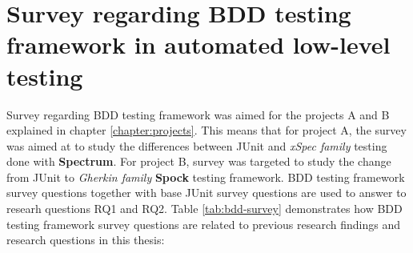     \vspace{20px}
    \begin{table}[H]
            \caption {NPS questions of developer loyalty towards low-level automated testing with JUnit} \label{tab:junit-pt3}

    \end{table}
    \clearpage
\restoregeometry






\section{Survey regarding BDD testing framework in automated low-level testing}
\label{section:bdd-survey}
Survey regarding BDD testing framework was aimed for the projects A and B explained in chapter \ref{chapter:projects}. This means
that for project A, the survey was aimed at to study the differences between JUnit and \textit{xSpec family} testing done with \textbf{Spectrum}.
For project B, survey was targeted to study the change from JUnit to \textit{Gherkin family} \textbf{Spock} testing framework.
BDD testing framework survey questions together with base JUnit survey questions are used to answer to researh questions
RQ1 and RQ2. Table \ref{tab:bdd-survey} demonstrates how BDD testing framework survey questions are related to previous research findings
and research questions in this thesis:

